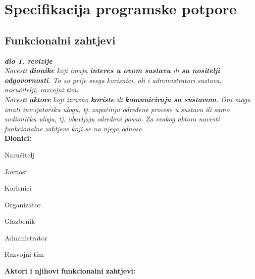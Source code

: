 \chapter{Specifikacija programske potpore}
		
	\section{Funkcionalni zahtjevi}
			
		\textbf{\textit{dio 1. revizije}}\\
		
		\textit{Navesti \textbf{dionike} koji imaju \textbf{interes u ovom sustavu} ili  \textbf{su nositelji odgovornosti}. To su prije svega korisnici, ali i administratori sustava, naručitelji, razvojni tim.}\\
			
		\textit{Navesti \textbf{aktore} koji izravno \textbf{koriste} ili \textbf{komuniciraju sa sustavom}. Oni mogu imati inicijatorsku ulogu, tj. započinju određene procese u sustavu ili samo sudioničku ulogu, tj. obavljaju određeni posao. Za svakog aktora navesti funkcionalne zahtjeve koji se na njega odnose.}\\
		
		
		\noindent \textbf{Dionici:}
		
		\begin{packed_enum}
			\item Naručitelj
			\item Javnost
			\item Korisnici
			\item Organizator
			\item Glazbenik 							
			\item Administrator
			\item Razvojni tim
		\end{packed_enum}
		
		\noindent \textbf{Aktori i njihovi funkcionalni zahtjevi:}
		
